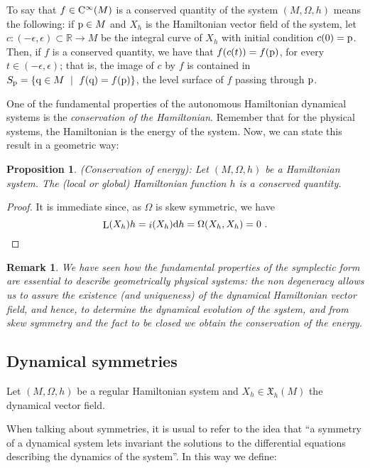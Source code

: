 \documentclass[12pt]{report}
\newtheorem{prop}[teor]{Proposition}
\newtheorem{remark}[teor]{Remark}
\def\qed{\ifvmode\removelastskip\fi
{\unskip\nobreak\hfil\penalty50\hbox{}\nobreak\hfil
\hbox{\vrule height1.2ex width1.2ex}\parfillskip=0pt
\finalhyphendemerits=0 \par\smallskip}}
\def\vf{\mathfrak X}
\def\d{{\rm d}}
\def\Real{\mathbb{R}}
\def\Lie{\mathop{\rm L}\nolimits}
\def\inn{\mathop{i}\nolimits}
\def\Cinfty{{\rm C}^\infty}
\begin{document}
To say that $f\in\Cinfty (M)$ is a conserved quantity of the
system $(M,\Omega,h)$ means the following:
if ${\rm p} \in M$ and $X_h$ is the Hamiltonian vector field of the system,
let $c\colon(-\epsilon ,\epsilon )\subset\Real\to M$ be the integral curve of $X_h$ 
with initial condition $c(0)={\rm p}$.
Then, if $f$ is a conserved quantity, we have that
$f(c(t))=f({\rm p})$, for every $t\in(-\epsilon ,\epsilon )$;
that is, the image of $c$ by $f$ is contained in $S_{\rm p}=\{ {\rm q}\in M \ \mid \ f({\rm q})=f({\rm p})\}$,
the level surface of $f$ passing through ${\rm p}$.

One of the fundamental properties of the autonomous Hamiltonian dynamical systems
is the {\sl  conservation of the Hamiltonian}. Remember that for the physical systems, the Hamiltonian is the energy of the system.
Now, we can state this result in a geometric way:

\begin{prop}
{\rm (Conservation of energy)}:
Let $(M,\Omega,h)$ be a Hamiltonian system.
The (local or global) Hamiltonian function $h$ is a conserved quantity.
\end{prop}
\begin{proof}
It is immediate since, as $\Omega$ is skew symmetric, we have
$$
\Lie (X_h) h = \inn (X_h) \d h = \Omega (X_h,X_h) = 0 \ .
$$
\qed  \end{proof}

\begin{remark}{\rm 
We have seen how the fundamental properties
of the symplectic form are essential to describe
geometrically physical systems:
the {\sl  non degeneracy} allows us to assure the existence (and uniqueness)
of the dynamical Hamiltonian vector field, and hence, to determine the dynamical evolution
of the system, and from skew symmetry  and the fact to be closed
we obtain the conservation of the energy.
}\end{remark}


\subsection{Dynamical symmetries}
\label{dynsym}

Let $(M,\Omega,h)$ be a regular Hamiltonian system and $X_h\in\vf_{h}(M)$ the dynamical vector field. 

When talking about symmetries, it is usual to refer to the idea that
``a symmetry of a dynamical system lets invariant the solutions
to the differential equations describing the dynamics of the system''.
In this way we define:
\end{document}
